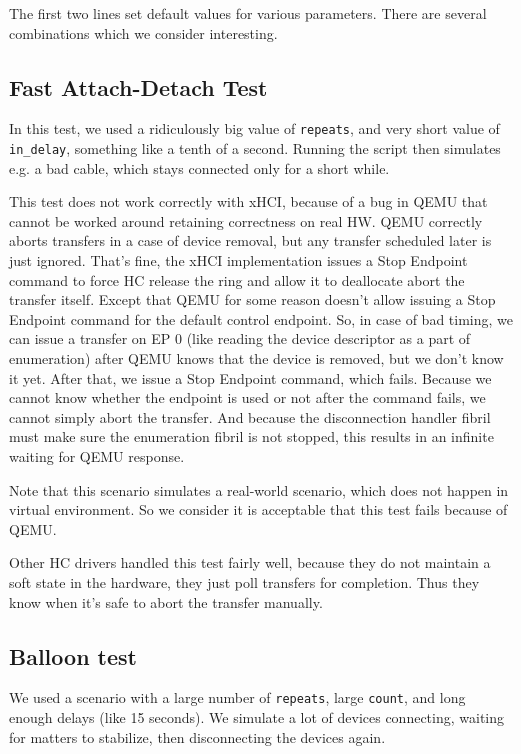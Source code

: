 The first two lines set default values for various parameters. There are
several combinations which we consider interesting.

\subsection{Fast Attach-Detach Test}

In this test, we used a ridiculously big value of \texttt{repeats}, and very
short value of \texttt{in\_delay}, something like a tenth of a second. Running
the script then simulates e.g. a bad cable, which stays connected only for
a short while.

This test does not work correctly with xHCI, because of a bug in QEMU that cannot
be worked around retaining correctness on real HW. QEMU correctly aborts
transfers in a case of device removal, but any transfer scheduled later is just
ignored. That's fine, the xHCI implementation issues a Stop Endpoint command to
force HC release the ring and allow it to deallocate abort the transfer itself.
Except that QEMU for some reason doesn't allow issuing a Stop Endpoint command
for the default control endpoint. So, in case of bad timing, we can issue
a transfer on EP 0 (like reading the device descriptor as a part of
enumeration) after QEMU knows that the device is removed, but we don't know it
yet. After that, we issue a Stop Endpoint command, which fails. Because we
cannot know whether the endpoint is used or not after the command fails, we
cannot simply abort the transfer. And because the disconnection handler fibril
must make sure the enumeration fibril is not stopped, this results in an
infinite waiting for QEMU response.

Note that this scenario simulates a real-world scenario, which does not happen
in virtual environment. So we consider it is acceptable that this test fails
because of QEMU.

Other HC drivers handled this test fairly well, because they do not maintain
a soft state in the hardware, they just poll transfers for completion. Thus
they know when it's safe to abort the transfer manually.

\subsection{Balloon test}

We used a scenario with a large number of \texttt{repeats}, large \texttt{count},
and long enough delays (like 15 seconds). We simulate a lot of devices connecting,
waiting for matters to stabilize, then disconnecting the devices again.

